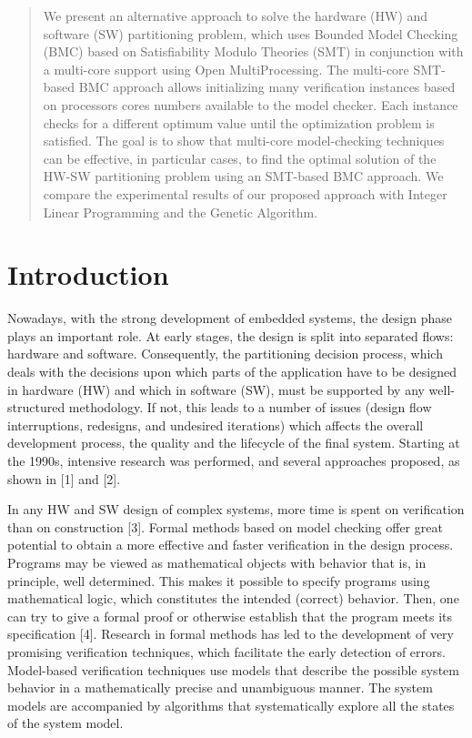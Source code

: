 \begin{abstract}
We present an alternative approach to solve the hardware (HW) and software (SW) partitioning problem, which uses Bounded Model Checking (BMC) based on Satisfiability Modulo Theories (SMT) in conjunction with a multi-core support using Open MultiProcessing. The multi-core SMT-based BMC approach allows initializing many verification instances based on processors cores numbers available to the model checker. Each instance checks for a different optimum value until the optimization problem is satisfied. The goal is to show that multi-core model-checking techniques can be effective, in particular cases, to find the optimal solution of the HW-SW partitioning problem using an SMT-based BMC approach. We compare the experimental results of our proposed approach with Integer Linear Programming and the Genetic Algorithm.
\end{abstract}

\section{Introduction}
Nowadays, with the strong development of embedded systems, the design phase plays an important role. At early stages, the design is split into separated flows: hardware and software. Consequently, the partitioning decision process, which deals with the decisions upon which parts of the application have to be designed in hardware (HW) and which in software (SW), must be supported by any well-structured methodology. If not, this leads to a number of issues (design flow interruptions, redesigns, and undesired iterations) which affects the overall development process, the quality and the lifecycle of the final system. Starting at the 1990s, intensive research was performed, and several approaches proposed, as shown in [1] and [2].

In any HW and SW design of complex systems, more time is spent on verification than on construction [3]. Formal methods based on model checking offer great potential to obtain a more effective and faster verification in the design process. Programs may be viewed as mathematical objects with behavior that is, in principle, well determined. This makes it possible to specify programs using mathematical logic, which constitutes the intended (correct) behavior. Then, one can try to give a formal proof or otherwise establish that the program meets its specification [4]. Research in formal methods has led to the development of very promising verification techniques, which facilitate the early detection of errors. Model-based verification techniques use models that describe the possible system behavior in a mathematically precise and unambiguous manner. The system models are accompanied by algorithms that systematically explore all the states of the system model.

